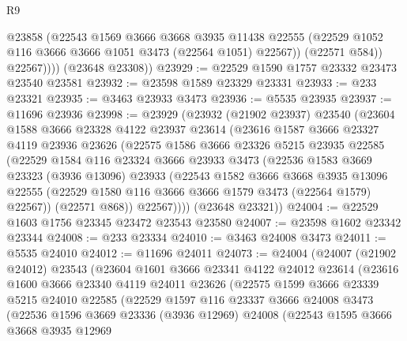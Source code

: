 \begin{lexlean}{R9}
\begin{coremodule}
                @23858
                (@22543
                  @1569
                  @3666
                  @3668
                  @3935
                  @11438
                  @22555
                  (@22529 @1052 @116 @3666 @3666 @1051 @3473 (@22564 @1051) @22567))
                (@22571 @584))
              @22567))))
      (@23648 @23308))
@23929 := @22529 @1590 @1757 @23332 @23473 @23540 @23581
@23932 := @23598 @1589 @23329 @23331
@23933 := @233 @23321
@23935 := @3463 @23933 @3473
@23936 := @5535 @23935
@23937 := @11696 @23936
@23998 := @23929
    (@23932
      (@21902 @23937)
      @23540
      (@23604
        @1588
        @3666
        @23328
        @4122
        @23937
        @23614
        (@23616
          @1587
          @3666
          @23327
          @4119
          @23936
          @23626
          (@22575
            @1586
            @3666
            @23326
            @5215
            @23935
            @22585
            (@22529
              @1584
              @116
              @23324
              @3666
              @23933
              @3473
              (@22536
                @1583
                @3669
                @23323
                (@3936 @13096)
                @23933
                (@22543
                  @1582
                  @3666
                  @3668
                  @3935
                  @13096
                  @22555
                  (@22529 @1580 @116 @3666 @3666 @1579 @3473 (@22564 @1579) @22567))
                (@22571 @868))
              @22567))))
      (@23648 @23321))
@24004 := @22529 @1603 @1756 @23345 @23472 @23543 @23580
@24007 := @23598 @1602 @23342 @23344
@24008 := @233 @23334
@24010 := @3463 @24008 @3473
@24011 := @5535 @24010
@24012 := @11696 @24011
@24073 := @24004
    (@24007
      (@21902 @24012)
      @23543
      (@23604
        @1601
        @3666
        @23341
        @4122
        @24012
        @23614
        (@23616
          @1600
          @3666
          @23340
          @4119
          @24011
          @23626
          (@22575
            @1599
            @3666
            @23339
            @5215
            @24010
            @22585
            (@22529
              @1597
              @116
              @23337
              @3666
              @24008
              @3473
              (@22536
                @1596
                @3669
                @23336
                (@3936 @12969)
                @24008
                (@22543
                  @1595
                  @3666
                  @3668
                  @3935
                  @12969

\end{coremodule}
\end{lexlean}
